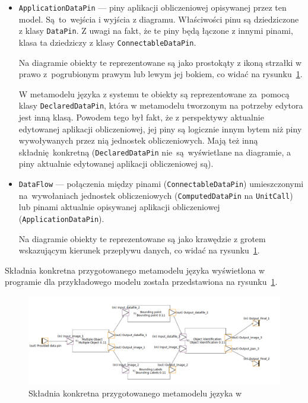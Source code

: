 \begin{itemize}
	\item \texttt{ApplicationDataPin} --- piny aplikacji obliczeniowej
	      opisywanej przez ten model. Są~to~wejścia i wyjścia z diagramu. Właściwości pinu są dziedziczone z klasy \texttt{DataPin}. Z uwagi na fakt, że te piny będą łączone z innymi pinami, klasa ta dziedziczy z klasy \texttt{ConnectableDataPin}.

	      Na diagramie obiekty te reprezentowane są jako prostokąty z ikoną strzałki w prawo z~pogrubionym prawym lub lewym jej bokiem, co widać na rysunku~\ref{rys:sirius-desktop-cal-example-model}.

	      W metamodelu języka \CAL{} z systemu \BalticLSC{} te obiekty są reprezentowane za~pomocą klasy \texttt{DeclaredDataPin}, która w metamodelu tworzonym na potrzeby edytora jest inną klasą. Powodem tego był fakt, że z perspektywy aktualnie edytowanej aplikacji obliczeniowej, jej piny są logicznie innym bytem niż piny wywoływanych przez nią jednostek obliczeniowych. Mają też inną składnię konkretną (\texttt{DeclaredDataPin} nie~są~wyświetlane na diagramie, a piny aktualnie edytowanej aplikacji obliczeniowej są).

	\item \texttt{DataFlow} --- połączenia między pinami
	      (\texttt{ConnectableDataPin}) umieszczonymi na~wywołaniach
	      jednostek obliczeniowych (\texttt{ComputedDataPin} na \texttt{UnitCall}) lub pinami aktualnie opisywanej aplikacji obliczeniowej (\texttt{ApplicationDataPin}).

	      Na diagramie obiekty te reprezentowane są jako krawędzie z grotem wskazującym kierunek przepływu danych, co widać na rysunku~\ref{rys:sirius-desktop-cal-example-model}.
\end{itemize}

Składnia konkretna przygotowanego metamodelu języka \CAL{} wyświetlona w
programie \SiriusDesktop{} dla przykładowego modelu została przedstawiona na
rysunku~\ref{rys:sirius-desktop-cal-example-model}.

\begin{figure}[!ht]
	\centering

	\includegraphics[width=0.95\linewidth]{./images/sirius-desktop-cal-example-model.png}
	\caption{Składnia konkretna przygotowanego metamodelu języka \CAL{} w
		\SiriusDesktop{}}\label{rys:sirius-desktop-cal-example-model}
\end{figure}

